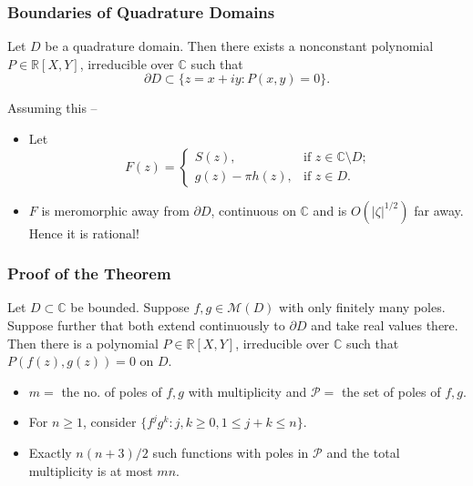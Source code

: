 \documentclass{beamer}
\begin{document}
\begin{frame}
 \frametitle{Boundaries of Quadrature Domains}

\begin{theorem}
Let $D$ be a quadrature domain. Then there exists a nonconstant polynomial $P \in \mathbb R[X, Y]$, irreducible over $\mathbb C$ such that
\[
\partial D \subset \{z = x + iy : P(x, y) = 0\}.
\]
\end{theorem}

Assuming this --

\begin{itemize}
 
 \item Let
\[
F(z) =
\begin{cases}
  S(z), &\text{if $z \in \mathbb C \setminus D$;}\\
  g(z) - \pi h(z), &\text{if $z \in D$}.
\end{cases}
\]

 \item $F$ is meromorphic away from $\partial D$, continuous on $\mathbb C$ and is $O(\vert \zeta \vert^{1/2})$ far away. Hence it is rational!

\end{itemize}

\end{frame}


\begin{frame}
 \frametitle{Proof of the Theorem}

\begin{lemma}
Let $D \subset \mathbb C$ be bounded. Suppose $f, g \in \mathcal M(D)$ with only finitely many poles. Suppose further that both extend continuously to $\partial D$ and take real values 
there. Then there is a polynomial $P \in \mathbb R[X, Y]$, irreducible over $\mathbb C$ such that $P(f(z), g(z)) = 0$ on $D$.
\end{lemma}

\begin{itemize}
 \item $m = $ the no. of poles of $f, g$ with multiplicity and $\mathcal P = $ the set of poles of $f, g$.

 \item For $n \ge 1$, consider $\{ f^j g^k : j, k \ge 0, 1 \le j +k \le n\}$.

 \item Exactly $n(n + 3)/2$ such functions with poles in $\mathcal P$ and the total multiplicity is at most $mn$.

\end{itemize}

\end{frame}
\end{document}
